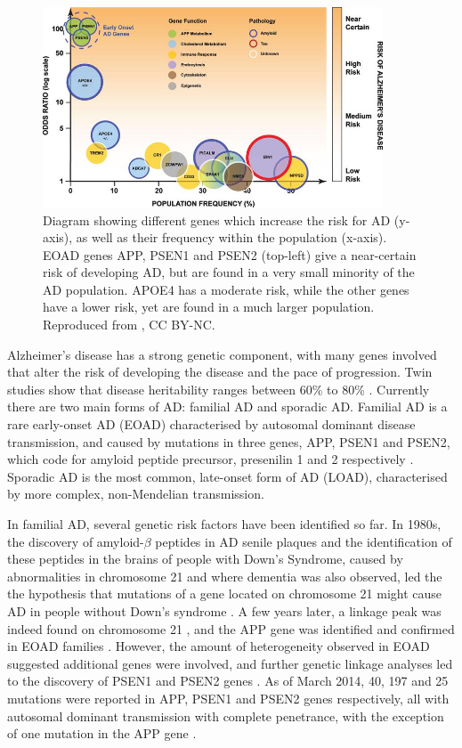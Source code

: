 \begin{figure}
\centering
\includegraphics[width=0.9\textwidth]{images/adGenesMap}
\caption[Different genes and associated risk for AD]{Diagram showing different genes which increase the risk for AD (y-axis), as well as their frequency within the population (x-axis). EOAD genes APP, PSEN1 and PSEN2 (top-left) give a near-certain risk of developing AD, but are found in a very small minority of the AD population. APOE4 has a moderate risk, while the other genes have a lower risk, yet are found in a much larger population. Reproduced from \cite{robinson2017recent}, CC BY-NC.}
\label{fig:bckAdGenesMap}
\end{figure}

Alzheimer's disease has a strong genetic component, with many genes involved that alter the risk of developing the disease and the pace of progression. Twin studies show that disease heritability ranges between 60\% to 80\% \cite{bergem1997role,gatz1997heritability}. Currently there are two main forms of AD: familial AD and sporadic AD. Familial AD is a rare early-onset AD (EOAD) characterised by autosomal dominant disease transmission, and caused by mutations in three genes, APP, PSEN1 and PSEN2, which code for amyloid peptide precursor, presenilin 1 and 2 respectively \cite{chouraki2014genetics}. Sporadic AD is the most common, late-onset form of AD (LOAD), characterised by more complex, non-Mendelian transmission. 

In familial AD, several genetic risk factors have been identified so far. In 1980s, the discovery of amyloid-$\beta$ peptides in AD senile plaques and the identification of these peptides in the brains of people with Down's Syndrome, caused by abnormalities in chromosome 21 and where dementia was also observed, led the the hypothesis that mutations of a gene located on chromosome 21 might cause AD in people without Down's syndrome \cite{glenner1984alzheimer}. A few years later, a linkage peak was indeed found on chromosome 21 \cite{st1987genetic}, and the APP gene was identified \cite{goldgaber1987characterization} and confirmed in EOAD families \cite{chartier1991early}. However, the amount of heterogeneity observed in EOAD suggested additional genes were involved, and further genetic linkage analyses led to the discovery of PSEN1 \cite{sherrington1995cloning} and PSEN2 genes \cite{levy1995candidate}. As of March 2014, 40, 197 and 25 mutations were reported in APP, PSEN1 and PSEN2 genes respectively, all with autosomal dominant transmission with complete penetrance, with the exception of one mutation in the APP gene \cite{chouraki2014genetics}.

